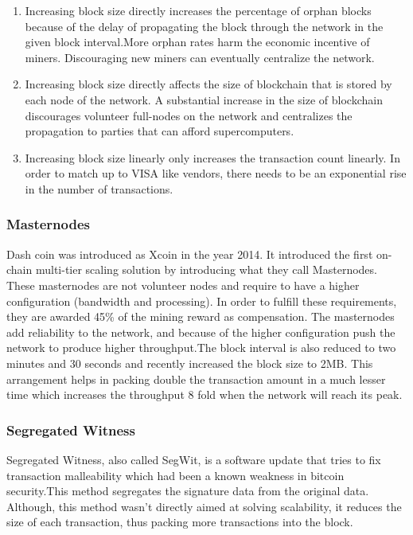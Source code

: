 \documentclass[journal,12pt,onecolumn,draftclsnofoot,]{IEEEtran}
\begin{document}
\begin{enumerate}
    \item Increasing block size directly increases the percentage of orphan
        blocks because of the delay of propagating the block through the network
        in the given block interval.More orphan rates harm the economic
        incentive of miners. Discouraging new miners can eventually centralize
        the network.

    \item Increasing block size directly affects the size of blockchain that is
        stored by each node of the network. A substantial increase in the size
        of blockchain discourages volunteer full-nodes on the network and
        centralizes the propagation to parties that can afford supercomputers.

    \item Increasing block size linearly only increases the transaction count
        linearly. In order to match up to VISA like vendors, there needs to be
        an exponential rise in the number of transactions. 

\end{enumerate}

\subsubsection{Masternodes}
Dash \cite{dash} coin was introduced as Xcoin in the year 2014. It introduced the first
on-chain multi-tier scaling solution by introducing what they call Masternodes.
These masternodes are not volunteer nodes and require to have a higher
configuration (bandwidth and processing). In order to fulfill these
requirements, they are awarded 45\% of the mining reward as compensation. The masternodes add
reliability to the network, and because of the higher configuration push the
network to produce higher throughput.The block interval is also reduced to
two minutes and 30 seconds and recently increased the block size to 2MB. This
arrangement helps in packing double the transaction amount in a much lesser time
which increases the throughput 8 fold when the network will reach its peak.

\subsubsection{Segregated Witness \cite{segwit}}
Segregated Witness, also called SegWit, is a software update that tries to fix
transaction malleability which had been a known weakness in bitcoin
security.This method segregates the signature data from the original data. 
Although, this method wasn't directly aimed at solving scalability, it reduces the
size of each transaction, thus packing more transactions into the block. 
\end{document}
